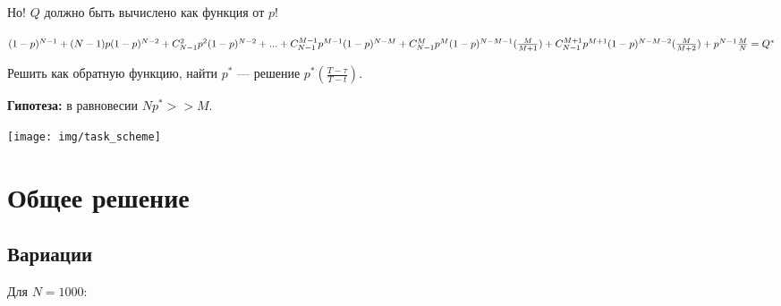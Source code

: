 Но! $Q$ должно быть вычислено как функция от $p$!

$(1-p)^{N-1} + \\ (N-1)p(1-p)^{N-2} + \\ C_{N-1}^2 p^2(1-p)^{N-2} + ... + \\ C_{N-1}^{M-1}p^{M-1}(1-p)^{N-M} + \\ C_{N-1}^{M}p^M(1-p)^{N-M-1}(\frac{M}{M+1}) + \\ C_{N-1}^{M+1}p^{M+1}(1-p)^{N-M-2}(\frac{M}{M+2}) + \\ p^{N-1}\frac{M}{N} = \\ Q^*$

Решить как обратную функцию, найти $p^*$ — решение $p^*(\frac{T-\tau}{T-t})$.

\textbf{Гипотеза:} в равновесии $Np^* >> M$.




\bigskip

\texttt{[image: img/task\_scheme]}


\section{Общее решение}


\subsection{Вариации}

Для $N=1000$:

